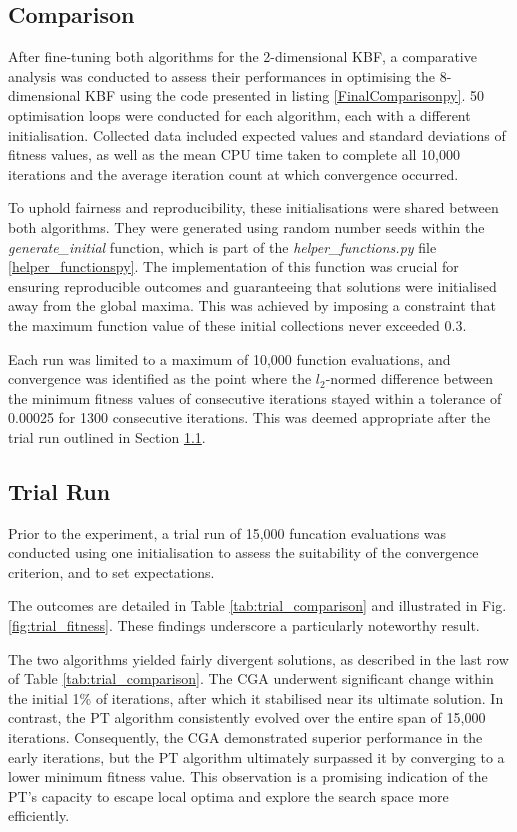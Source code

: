 \documentclass[10pt]{article}
\begin{document}
\begin{multicols}{2}
\section{Comparison}
\label{sec:CGA_QEG_comparison}

After fine-tuning both algorithms for the 2-dimensional KBF, a comparative analysis was conducted to assess their performances in optimising the 8-dimensional KBF using the code presented in listing \ref{FinalComparisonpy}. 50 optimisation loops were conducted for each algorithm, each with a different initialisation.  Collected data included expected values and standard deviations of fitness values, as well as the mean CPU time taken to complete all 10,000 iterations and the average iteration count at which convergence occurred.

To uphold fairness and reproducibility, these initialisations were shared between both algorithms. They were generated using random number seeds within the \textit{generate\_initial} function, which is part of the \textit{helper\_functions.py} file \ref{helper_functionspy}. The implementation of this function was crucial for ensuring reproducible outcomes and guaranteeing that solutions were initialised away from the global maxima. This was achieved by imposing a constraint that the maximum function value of these initial collections never exceeded 0.3.

Each run was limited to a maximum of 10,000 function evaluations, and convergence was identified as the point where the $l_2$-normed difference between the minimum fitness values of consecutive iterations stayed within a tolerance of 0.00025 for 1300 consecutive iterations. This was deemed appropriate after the trial run outlined in Section \ref{sec:trial}.

\subsection{Trial Run}
\label{sec:trial}

Prior to the experiment, a trial run of 15,000 funcation evaluations was conducted using one initialisation to assess the suitability of the convergence criterion, and to set expectations.

The outcomes are detailed in Table \ref{tab:trial_comparison} and illustrated in Fig. \ref{fig:trial_fitness}. These findings underscore a particularly noteworthy result.

The two algorithms yielded fairly divergent solutions, as described in the last row of Table \ref{tab:trial_comparison}. The CGA underwent significant change within the initial 1\% of iterations, after which it stabilised near its ultimate solution. In contrast, the PT algorithm consistently evolved over the entire span of 15,000 iterations. Consequently, the CGA demonstrated superior performance in the early iterations, but the PT algorithm ultimately surpassed it by converging to a lower minimum fitness value. This observation is a promising indication of the PT's capacity to escape local optima and explore the search space more efficiently.


\end{multicols}
\end{document}
